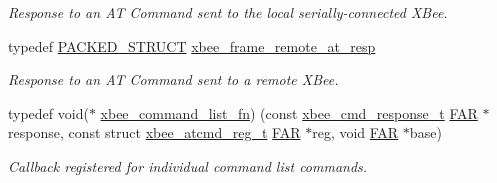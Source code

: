 \begin{DoxyCompactItemize}
\begin{DoxyCompactList}\small\item\em Response to an AT Command sent to the local serially-\/connected X\+Bee. \end{DoxyCompactList}\item 
typedef \hyperlink{group___s_x_a_ga4233297bd31be5c273d4fb0758cc54d7}{P\+A\+C\+K\+E\+D\+\_\+\+S\+T\+R\+U\+CT} \hyperlink{group__xbee__atcmd_ga5c11edcb9c5f6b11eec5d5d1c37cfbfd}{xbee\+\_\+frame\+\_\+remote\+\_\+at\+\_\+resp}
\begin{DoxyCompactList}\small\item\em Response to an AT Command sent to a remote X\+Bee. \end{DoxyCompactList}\item 
typedef void($\ast$ \hyperlink{group__xbee__atcmd_ga7909235eb77ba64c93742f8f9013d7fb}{xbee\+\_\+command\+\_\+list\+\_\+fn}) (const \hyperlink{structxbee__cmd__response__t}{xbee\+\_\+cmd\+\_\+response\+\_\+t} \hyperlink{group__hal_gaef060b3456fdcc093a7210a762d5f2ed}{F\+AR} $\ast$response, const struct \hyperlink{structxbee__atcmd__reg__t}{xbee\+\_\+atcmd\+\_\+reg\+\_\+t} \hyperlink{group__hal_gaef060b3456fdcc093a7210a762d5f2ed}{F\+AR} $\ast$reg, void \hyperlink{group__hal_gaef060b3456fdcc093a7210a762d5f2ed}{F\+AR} $\ast$base)
\begin{DoxyCompactList}\small\item\em Callback registered for individual command list commands. \end{DoxyCompactList}\end{DoxyCompactItemize}

